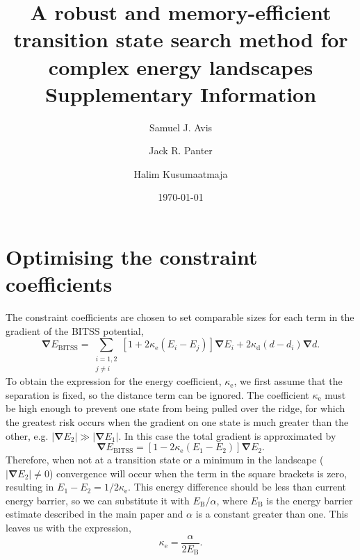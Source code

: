 \documentclass[aip,jcp,11pt]{revtex4-2}
\newcommand{\abs}[1]{\left| #1 \right|}
\newcommand{\grad}{\bm{\nabla}}
\begin{document}
\title{A robust and memory-efficient transition state search method for complex energy landscapes \\ Supplementary Information}
\date{\today}
\author{Samuel J. Avis}
\author{Jack R. Panter}
\author{Halim Kusumaatmaja}
\maketitle

\section{Optimising the constraint coefficients}
The constraint coefficients are chosen to set comparable sizes for each term in the gradient of the BITSS potential,
\begin{equation}
  \grad E_\text{BITSS} = \sum_{\substack{i=1,2 \\ j\neq i}} \left[ 1 + 2 \kappa_\text{e} (E_i - E_j) \right] \grad E_i + 2 \kappa_\text{d} (d - d_i) \grad d.
\end{equation}
To obtain the expression for the energy coefficient, $\kappa_\text{e}$, we first assume that the separation is fixed, so the distance term can be ignored.
The coefficient $\kappa_\text{e}$ must be high enough to prevent one state from being pulled over the ridge, for which the greatest risk occurs when the gradient on one state is much greater than the other, e.g. $\abs{\grad E_2} \gg \abs{\grad E_1}$.
In this case the total gradient is approximated by
\begin{equation}
  \grad E_\text{BITSS} = \left[ 1 - 2 \kappa_\text{e} (E_1 - E_2) \right] \grad E_2.
\end{equation}
Therefore, when not at a transition state or a minimum in the landscape ($\abs{\grad E_2} \neq 0$) convergence will occur when the term in the square brackets is zero, resulting in $E_1 - E_2 = 1 / 2 \kappa_\text{e}$.
This energy difference should be less than current energy barrier, so we can substitute it with $E_\text{B} / \alpha$, where $E_\text{B}$ is the energy barrier estimate described in the main paper and $\alpha$ is a constant greater than one.
This leaves us with the expression,
\begin{equation}
  \kappa_\text{e} = \frac {\alpha} {2 E_\text{B}}.
\end{equation}
\end{document}
